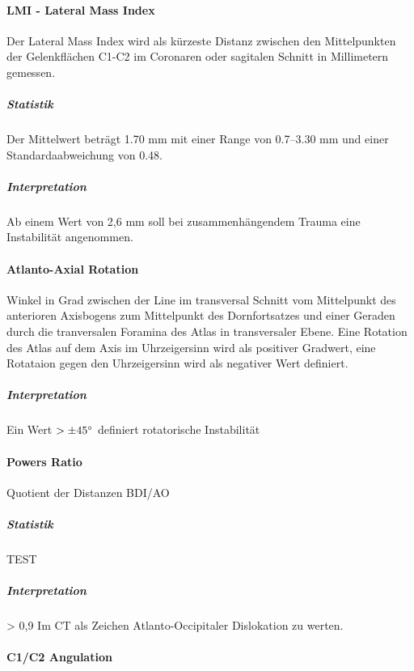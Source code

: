 \documentclass{report}
\begin{document}
\paragraph{LMI - Lateral Mass Index}

Der Lateral Mass Index wird als kürzeste Distanz zwischen den Mittelpunkten der Gelenkflächen C1-C2 im Coronaren oder sagitalen Schnitt in Millimetern gemessen. 
\subparagraph{Statistik}
Der Mittelwert beträgt 1.70 mm mit einer Range von 0.7–3.30 mm und einer Standardaabweichung von 0.48.
\subparagraph{Interpretation}
 Ab einem Wert von 2,6 mm soll bei zusammenhängendem Trauma eine Instabilität angenommen.

 


\paragraph{Atlanto-Axial Rotation} %
\label{par:c1_c2_rotation}
Winkel in Grad zwischen der Line im transversal Schnitt vom Mittelpunkt des anterioren Axisbogens zum Mittelpunkt des Dornfortsatzes und einer Geraden durch die tranversalen Foramina des Atlas in transversaler Ebene.
Eine Rotation des Atlas auf dem Axis im Uhrzeigersinn wird als positiver Gradwert, eine Rotataion gegen den Uhrzeigersinn wird als negativer Wert definiert.

\subparagraph{Interpretation}
 Ein Wert  $>\pm 45 \degree$ definiert rotatorische Instabilität
\paragraph{Powers Ratio} %
\label{par:powers_ratio}
Quotient der Distanzen BDI/AO

\subparagraph{Statistik}
\begin{tabular}
TEST
\end{tabular}
\subparagraph{Interpretation} %
\label{subp:}
> 0,9 Im CT als Zeichen Atlanto-Occipitaler Dislokation zu werten.


\paragraph{C1/C2 Angulation} %
\label{par:c1_c2_angulation}

\paragraph{}
\end{document}
